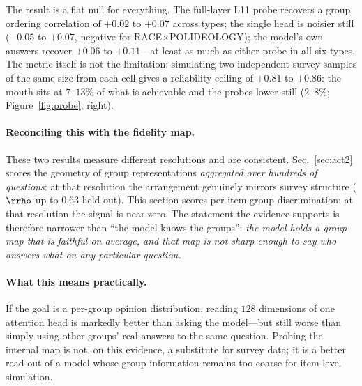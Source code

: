 The result is a flat null for everything. The full-layer L11 probe
recovers a group ordering correlation of $+0.02$ to $+0.07$ across
types; the single head \starhead{} is noisier still ($-0.05$ to
$+0.07$, negative for RACE$\times$POLIDEOLOGY); the model's own answers
recover $+0.06$ to $+0.11$---at least as much as either probe in all
six types. The metric itself is not the limitation: simulating two
independent survey samples of the same size from each cell gives a
reliability ceiling of $+0.81$ to $+0.86$: the mouth sits at
$7$--$13\%$ of what is achievable and the probes lower still
($2$--$8\%$; Figure~\ref{fig:probe}, right).

\paragraph{Reconciling this with the fidelity map.} These two results
measure different resolutions and are consistent. Sec.~\ref{sec:act2}
scores the geometry of
group representations \emph{aggregated over hundreds of questions}: at
that resolution the arrangement genuinely mirrors survey structure
($\rrho$ up to $0.63$ held-out). This section scores per-item group
discrimination: at that resolution the signal is near zero. The
statement the evidence supports is therefore narrower than
``the model knows the groups'': \emph{the model holds a group map that is
faithful on average, and that map is not sharp enough to say who answers
what on any particular question.}

\paragraph{What this means practically.} If the goal is a per-group
opinion distribution, reading $128$ dimensions of one attention head is
markedly better than asking the model---but still worse than simply using
other groups' real answers to the same question. Probing the internal map
is not, on this evidence, a substitute for survey data; it is a better
read-out of a model whose group information remains too coarse for
item-level simulation.

